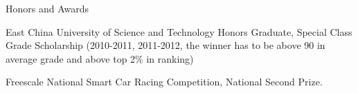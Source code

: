 \documentclass{resume}
\begin{document}

\begin{rSection}{Honors and Awards} \itemsep -2pt
\item East China University of Science and Technology Honors Graduate, Special Class Grade Scholarship (2010-2011, 2011-2012, the winner has to be above 90 in average grade and above top 2\% in ranking)
\item Freescale National Smart Car Racing Competition, National Second Prize.
\end{rSection}
\end{document}
